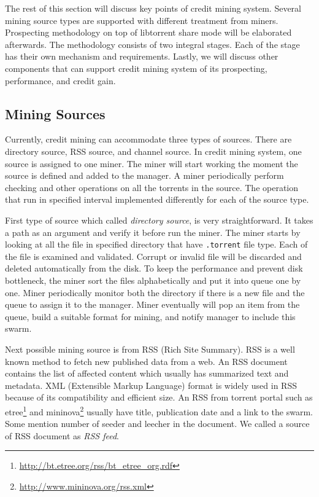 The rest of this section will discuss key points of credit mining system. Several mining source types are supported with different treatment from miners. Prospecting methodology on top of libtorrent share mode will be elaborated afterwards. The methodology consists of two integral stages. Each of the stage has their own mechanism and requirements. Lastly, we will discuss other components that can support credit mining system of its prospecting, performance, and credit gain. 

\subsection{Mining Sources}
\label{section:msource} 
Currently, credit mining can accommodate three types of sources. There are directory source, RSS source, and channel source. In credit mining system, one source is assigned to one miner. The miner will start working the moment the source is defined and added to the manager. A miner periodically perform checking and other operations on all the torrents in the source. The operation that run in specified interval implemented differently for each of the source type. 

First type of source which called \textit{directory source}, is very straightforward. It takes a path as an argument and verify it before run the miner. The miner starts by looking at all the file in specified directory that have \texttt{.torrent} file type. Each of the file is examined and validated. Corrupt or invalid file will be discarded and deleted automatically from the disk. To keep the performance and prevent disk bottleneck, the miner sort the files alphabetically and put it into queue one by one. Miner periodically monitor both the directory if there is a new file and the queue to assign it to the manager. Miner eventually will pop an item from the queue, build a suitable format for mining, and notify manager to include this swarm.

Next possible mining source is from RSS (Rich Site Summary). RSS is a well known method to fetch new published data from a web. An RSS document contains the list of affected content which usually has summarized text and metadata. XML (Extensible Markup Language) format is widely used in RSS because of its compatibility and efficient size. An RSS from torrent portal such as etree\footnote{\url{http://bt.etree.org/rss/bt_etree_org.rdf}} and mininova\footnote{\url{http://www.mininova.org/rss.xml}} usually have title, publication date and a link to the swarm. Some mention number of seeder and leecher in the document. We called a source of RSS document as \textit{RSS feed}. 

